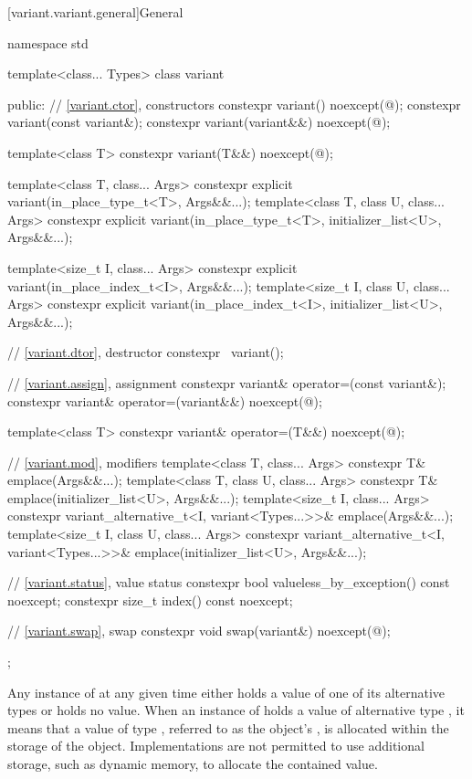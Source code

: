 [variant.variant.general]{General}

\begin{codeblock}
namespace std {
  template<class... Types>
  class variant {
  public:
    // \ref{variant.ctor}, constructors
    constexpr variant() noexcept(@\seebelow@);
    constexpr variant(const variant&);
    constexpr variant(variant&&) noexcept(@\seebelow@);

    template<class T>
      constexpr variant(T&&) noexcept(@\seebelow@);

    template<class T, class... Args>
      constexpr explicit variant(in_place_type_t<T>, Args&&...);
    template<class T, class U, class... Args>
      constexpr explicit variant(in_place_type_t<T>, initializer_list<U>, Args&&...);

    template<size_t I, class... Args>
      constexpr explicit variant(in_place_index_t<I>, Args&&...);
    template<size_t I, class U, class... Args>
      constexpr explicit variant(in_place_index_t<I>, initializer_list<U>, Args&&...);

    // \ref{variant.dtor}, destructor
    constexpr ~variant();

    // \ref{variant.assign}, assignment
    constexpr variant& operator=(const variant&);
    constexpr variant& operator=(variant&&) noexcept(@\seebelow@);

    template<class T> constexpr variant& operator=(T&&) noexcept(@\seebelow@);

    // \ref{variant.mod}, modifiers
    template<class T, class... Args>
      constexpr T& emplace(Args&&...);
    template<class T, class U, class... Args>
      constexpr T& emplace(initializer_list<U>, Args&&...);
    template<size_t I, class... Args>
      constexpr variant_alternative_t<I, variant<Types...>>& emplace(Args&&...);
    template<size_t I, class U, class... Args>
      constexpr variant_alternative_t<I, variant<Types...>>&
        emplace(initializer_list<U>, Args&&...);

    // \ref{variant.status}, value status
    constexpr bool valueless_by_exception() const noexcept;
    constexpr size_t index() const noexcept;

    // \ref{variant.swap}, swap
    constexpr void swap(variant&) noexcept(@\seebelow@);
  };
}
\end{codeblock}

\pnum
Any instance of  at any given time either holds a value
of one of its alternative types or holds no value.
When an instance of  holds a value of alternative type ,
it means that a value of type , referred to as the 
object's , is allocated within the storage of the
 object.
Implementations are not permitted to use additional storage, such as dynamic
memory, to allocate the contained value.

